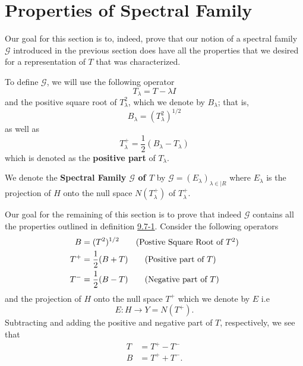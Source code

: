 \section{Properties of Spectral Family}

Our goal for this section is to, indeed, prove that our notion of a spectral family \( \mathcal{G} \) introduced in the previous section does have all the properties that we desired for a representation of \( T  \) that was characterized.

To define \( \mathcal{G} \), we will use the following operator
\[  {T}_{\lambda} = T - \lambda I  \]
and the positive square root of \( {T}_{\lambda}^{2}  \), which we denote by \( {B}_{\lambda} \); that is,
\[  {B}_{\lambda} = ({T}_{\lambda}^{2})^{1/2} \]
as well as 
\[  {T}_{\lambda}^{+} = \frac{ 1 }{ 2 }  ({B}_{\lambda} - {T}_{\lambda}) \]
which is denoted as the \textbf{positive part} of \( {T}_{\lambda} \).

\begin{definition}
    We denote the \textbf{Spectral Family \( \mathcal{G} \) of \( T  \)} by \( \mathcal{G} = ({E}_{\lambda})_{\lambda \in |R } \) where \( {E}_{\lambda}  \) is the projection of \( H  \) onto the null space \( N({T}_{\lambda}^{+}) \) of \( {T}_{\lambda}^{+} \).
\end{definition}

Our goal for the remaining of this section is to prove that indeed \( \mathcal{G} \) contains all the properties outlined in definition {\hyperref[9.7-1]{9.7-1}}. Consider the following operators 
\begin{align*}
    B &= (T^{2})^{1/2} \tag{Postive Square Root of \( T^{2} \)} \\
    T^{+} &= \frac{ 1 }{ 2 } ( B +T ) \tag{Positive part of \( T  \)} \\
    T^{-}&= \frac{ 1 }{ 2 }  (B - T ) \tag{Negative part of \( T  \)}
\end{align*}
and the projection of \( H  \) onto the null space \( T^{+ } \) which we denote by \( E  \) i.e  
\[  E: H \to Y = N(T^{+}). \]
Subtracting and adding the positive and negative part of \( T  \), respectively, we see that 
\begin{align*}
    T &= T^{+ } - T^{-} \\
    B &= T^{+} + T^{-}.
\end{align*}


